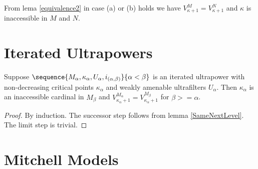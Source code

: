 \documentclass[oneside,12pt]{amsart}
\begin{document}
From lema \ref{equivalence2} in case (a) or (b) holds we have
$V^{M}_{\kappa+1} = V^{N}_{\kappa+1}$ and $\kappa$ is inaccessible
in $M$ and $N$.

\section{Iterated Ultrapowers}

\begin{lemma}
Suppose $\sequence{M_{\alpha}, \kappa_{\alpha}, U_{\alpha}, i_{(\alpha, \beta)}}{\alpha<\beta}$
is an iterated ultrapower with non-decreasing critical points $\kappa_{\alpha}$ and weakly amenable
ultrafilters $U_{\alpha}$. Then $\kappa_{\alpha}$ is an inaccessible cardinal in
$M_{\beta}$ and $V^{M_{\alpha}}_{\kappa_{\alpha} + 1} = V^{M_{\beta}}_{\kappa_{\alpha} + 1}$
for $\beta>=\alpha$.
\end{lemma}
\begin{proof}
By induction. The successor step follows from lemma \ref{SameNextLevel}. The limit step is trivial.
\end{proof}

\section{Mitchell Models}
\end{document}
